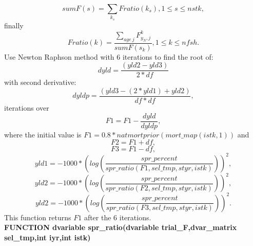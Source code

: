 \documentclass{article}
\begin{document}
\begin{equation}
    sumF(s)=\sum_{k_s}Fratio(k_s), 1\leq s  \leq nstk,
\end{equation}
finally
\begin{equation}
    Fratio(k)=\dfrac{\sum_{age \  j}F^k_{y_N,j}}{sumF(s_k)}, 1 \leq k \leq nfsh.
\end{equation}
Use Newton Raphson method with 6 iterations to find the root of:
\begin{equation}
    dyld=\dfrac{(yld2-yld3)}{2*df}
\end{equation}
with second derivative:
\begin{equation}
    dyldp=\dfrac{(yld3-(2*yld1)+yld2)}{df*df},
\end{equation}
iterations over
\begin{equation*}
    F1=F1-\dfrac{dyld}{dyldp},
\end{equation*}
where the initial value is $F1=0.8*natmortprior(mort\_map(istk,1))$ and
\begin{equation*}
    F2=F1+df,
\end{equation*}
\begin{equation*}
    F3=F1-df,
\end{equation*}
\begin{equation*}
    yld1=-1000*\left(log\left(\dfrac{spr\_percent}{spr\_ratio(F1, sel\_tmp,styr,istk)}\right)\right)^2,
\end{equation*}
\begin{equation*}
    yld2   = -1000*\left(log\left(\dfrac{spr\_percent}{spr\_ratio(F2, sel\_tmp,styr,istk)}\right)\right)^2,
\end{equation*}
\begin{equation*}
    yld2   = -1000*\left(log\left(\dfrac{spr\_percent}{spr\_ratio(F3, sel\_tmp,styr,istk)}\right)\right)^2.
\end{equation*}
This function returns $F1$ after the 6 iterations.\\

\textbf{FUNCTION dvariable spr\_ratio(dvariable trial\_F,dvar\_matrix sel\_tmp,int iyr,int istk)}\\
\end{document}
